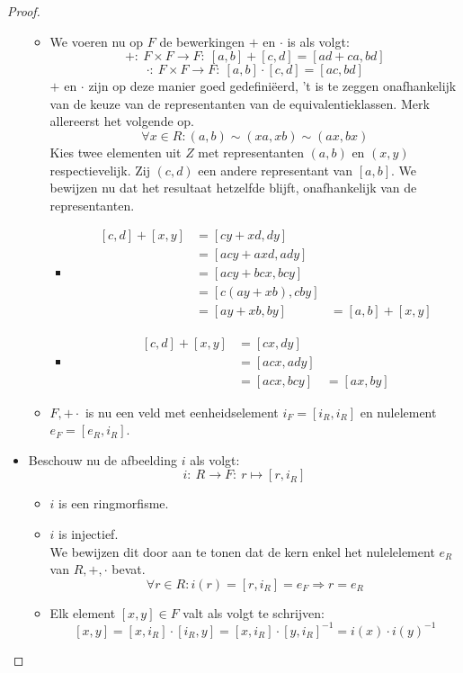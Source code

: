 \documentclass[main.tex]{subfiles}
\begin{document}
\begin{st}
\begin{proof}
\begin{itemize}
\begin{itemize}
      \item We voeren nu op $F$ de bewerkingen $+$ en $\cdot$ is als volgt:
        \[ +:\ F \times F \rightarrow F:\ [a,b] + [c,d] = [ad + ca, bd] \]
        \[ \cdot:\ F \times F \rightarrow F:\ [a,b] \cdot [c,d] = [ac,bd] \]
        $+$ en $\cdot$ zijn op deze manier goed gedefini\"eerd, 't is te zeggen onafhankelijk van de keuze van de representanten van de equivalentieklassen.
        Merk allereerst het volgende op.
        \[ \forall x \in R: (a,b) \sim (xa,xb) \sim (ax,bx) \]
        Kies twee elementen uit $Z$ met representanten $(a,b)$ en $(x,y)$ respectievelijk.
        Zij $(c,d)$ een andere representant van $[a,b]$.
        We bewijzen nu dat het resultaat hetzelfde blijft, onafhankelijk van de representanten.
        \begin{itemize}
        \item 
          \[
          \begin{array}{rll}
            [c,d] + [x,y] &= [cy+xd,dy] &\\
                          &= [acy + axd,ady] &\\
                          &= [acy + bcx, bcy] &\\
                          &= [c(ay+xb),cby] &\\
                          &= [ay + xb,by] &= [a,b] + [x,y]
          \end{array}
          \]
        \item
          \[
          \begin{array}{rll}
            [c,d] + [x,y] &= [cx,dy] &\\
                          &= [acx, ady] &\\
                          &= [acx,bcy] &= [ax, by]
          \end{array}
          \]
        \end{itemize}
      \item $F,+\cdot$ is nu een veld met eenheidselement $i_{F} = [i_{R},i_{R}]$ en nulelement $e_{F} = [e_{R},i_{R}]$.
        \waarom
      \end{itemize}
    \item Beschouw nu de afbeelding $i$ als volgt:
      \[ i:\ R \rightarrow F:\ r \mapsto [r,i_{R}] \]
      \begin{itemize}
      \item $i$ is een ringmorfisme. \waarom
      \item $i$ is injectief.\\
        We bewijzen dit door aan te tonen dat de kern enkel het nulelelement $e_{R}$ van $R,+,\cdot$ bevat.
        \[ \forall r\in R: i(r) = [r,i_{R}] = e_{F} \Rightarrow r = e_{R} \]
      \item Elk element $[x,y]\in F$ valt als volgt te schrijven:
        \[ [x,y] = [x,i_{R}] \cdot [i_{R},y] = [x,i_{R}] \cdot [y,i_{R}]^{-1} = i(x) \cdot i(y)^{-1} \]
      \end{itemize}
    \end{itemize}
  \end{proof}
\end{st}
\end{document}
